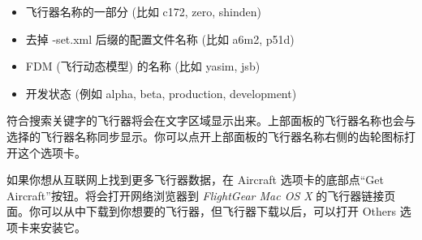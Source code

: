 \ifchinese
\begin{itemize}
\item 飞行器名称的一部分 (比如 c172, zero, shinden)
\item 去掉 -set.xml 后缀的配置文件名称 (比如 a6m2, p51d)
\item FDM (飞行动态模型) 的名称 (比如 yasim, jsb)
\item 开发状态 (例如 alpha, beta, production, development)
\end{itemize}
符合搜索关键字的飞行器将会在文字区域显示出来。上部面板的飞行器名称也会与选择的飞行器名称同步显示。你可以点开上部面板的飞行器名称右侧的齿轮图标打开这个选项卡。

如果你想从互联网上找到更多飞行器数据，在 Aircraft 选项卡的底部点“Get Aircraft”按钮。将会打开网络浏览器到 \textit{FlightGear Mac OS X} 的飞行器链接页面。你可以从中下载到你想要的飞行器，但飞行器下载以后，可以打开 Others 选项卡来安装它。

